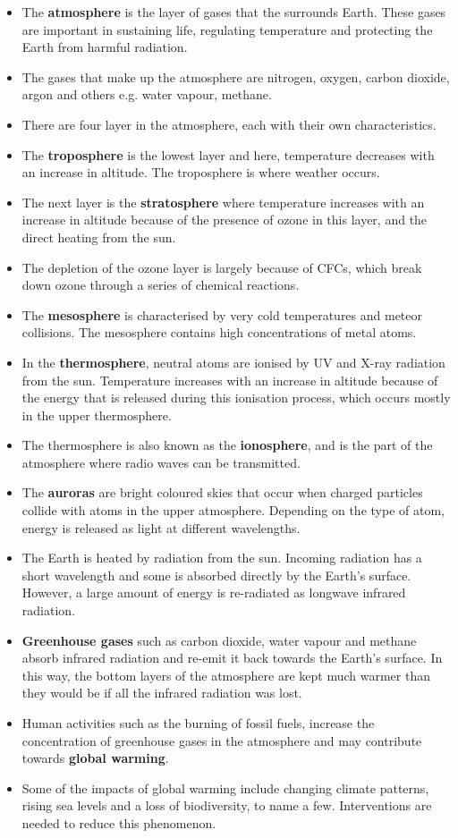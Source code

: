 \begin{itemize}[noitemsep]
\item{The \textbf{atmosphere} is the layer of gases that the surrounds Earth. These gases are important in sustaining life, regulating temperature and protecting the Earth from harmful radiation.}
\item{The gases that make up the atmosphere are nitrogen, oxygen, carbon dioxide, argon and others e.g. water vapour, methane.}
\item{There are four layer in the atmosphere, each with their own characteristics.}
\item{The \textbf{troposphere} is the lowest layer and here, temperature decreases with an increase in altitude. The troposphere is where weather occurs.}
\item{The next layer is the \textbf{stratosphere} where temperature increases with an increase in altitude because of the presence of ozone in this layer, and the direct heating from the sun.}
\item{The depletion of the ozone layer is largely because of CFCs, which break down ozone through a series of chemical reactions.}
\item{The \textbf{mesosphere} is characterised by very cold temperatures and meteor collisions. The mesosphere contains high concentrations of metal atoms.}
\item{In the \textbf{thermosphere}, neutral atoms are ionised by UV and X-ray radiation from the sun. Temperature increases with an increase in altitude because of the energy that is released during this ionisation process, which occurs mostly in the upper thermosphere. }
\item{The thermosphere is also known as the \textbf{ionosphere}, and is the part of the atmosphere where radio waves can be transmitted.}
\item{The \textbf{auroras} are bright coloured skies that occur when charged particles collide with atoms in the upper atmosphere. Depending on the type of atom, energy is released as light at different wavelengths.}
\item{The Earth is heated by radiation from the sun. Incoming radiation has a short wavelength and some is absorbed directly by the Earth's surface. However, a large amount of energy is re-radiated as longwave infrared radiation.}
\item{\textbf{Greenhouse gases} such as carbon dioxide, water vapour and methane absorb infrared radiation and re-emit it back towards the Earth's surface. In this way, the bottom layers of the atmosphere are kept much warmer than they would be if all the infrared radiation was lost.}
\item{Human activities such as the burning of fossil fuels, increase the concentration of greenhouse gases in the atmosphere and may contribute towards \textbf{global warming}.}
\item{Some of the impacts of global warming include changing climate patterns, rising sea levels and a loss of biodiversity, to name a few. Interventions are needed to reduce this phenomenon.}
\end{itemize}

